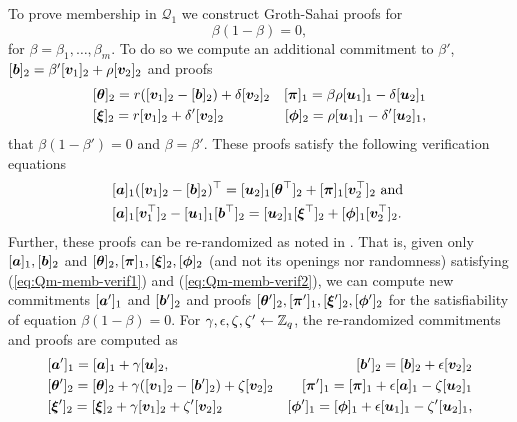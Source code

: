 
To prove membership in $\mathcal{Q}_1$ we construct Groth-Sahai proofs for
\begin{equation}
\beta(1-\beta)=0 \label{eq:Qm-memb},
\end{equation}
for $\beta=\beta_1,\ldots,\beta_m$.
To do so we compute an additional commitment to $\beta'$, $[{\boldsymbol{b}}]_2 = \beta'[{\boldsymbol{v}}_1]_2+\rho[{\boldsymbol{v}}_2]_2$ and proofs
\begin{align}
&[{\boldsymbol{\theta}}]_2 = r([{\boldsymbol{v}}_1]_2-[{\boldsymbol{b}}]_2)+\delta[{\boldsymbol{v}}_2]_2
&[{\boldsymbol{\pi}}]_1 = \beta\rho[{\boldsymbol{u}}_1]_1-\delta[{\boldsymbol{u}}_2]_1 \nonumber\\
&[{\boldsymbol{\xi}}]_2 = r[{\boldsymbol{v}}_1]_2+\delta'[{\boldsymbol{v}}_2]_2
&[{\boldsymbol{\phi}}]_2 = \rho[{\boldsymbol{u}}_1]_1 -\delta'[{\boldsymbol{u}}_2]_1,
\label{eq:Qm-memb-proofs}
\end{align}
that $\beta(1-\beta')=0$ and $\beta=\beta'$.
These proofs satisfy the following verification equations
\begin{align}
&[{\boldsymbol{a}}]_1([{\boldsymbol{v}}_1]_2-[{\boldsymbol{b}}]_2)^\top = [{\boldsymbol{u}}_2]_1[{\boldsymbol{\theta}}^\top]_2+[{\boldsymbol{\pi}}]_1[{\boldsymbol{v}}^\top_2]_2\text{ and } \label{eq:Qm-memb-verif1} \\
&[{\boldsymbol{a}}]_1[{\boldsymbol{v}}_1^\top]_2-[{\boldsymbol{u}}_1]_1[{\boldsymbol{b}}^\top]_2 = [{\boldsymbol{u}}_2]_1[{\boldsymbol{\xi}}^\top]_2 + [{\boldsymbol{\phi}}]_1[{\boldsymbol{v}}^\top_2]_2. \label{eq:Qm-memb-verif2}
\end{align}
Further, these proofs can be re-randomized as noted in \cite{C:BCCKLS09}. That is, given only $[{\boldsymbol{a}}]_1,[{\boldsymbol{b}}]_2$ and $[{\boldsymbol{\theta}}]_2,[{\boldsymbol{\pi}}]_1,[{\boldsymbol{\xi}}]_2,[{\boldsymbol{\phi}}]_2$ (and not its openings nor randomness) satisfying (\ref{eq:Qm-memb-verif1}) and (\ref{eq:Qm-memb-verif2}), we can compute new commitments $[{\boldsymbol{a}}']_1$ and $[{\boldsymbol{b}}']_2$ and proofs $[{\boldsymbol{\theta}}']_2,[{\boldsymbol{\pi}}']_1,[{\boldsymbol{\xi}}']_2,[{\boldsymbol{\phi}}']_2$ for the satisfiability of equation $\beta(1-\beta)=0$. For $\gamma,\epsilon,\zeta,\zeta'\gets\mathbb{Z}_q$, the re-randomized commitments and proofs are computed as
\begin{align}
&[{\boldsymbol{a}}']_1 = [{\boldsymbol{a}}]_1 + \gamma[{\boldsymbol{u}}]_2, &[{\boldsymbol{b}}']_2 = [{\boldsymbol{b}}]_2 + \epsilon[{\boldsymbol{v}}_2]_2 \nonumber\\
&[{\boldsymbol{\theta}}']_2 = [{\boldsymbol{\theta}}]_2 + \gamma([{\boldsymbol{v}}_1]_2-[{\boldsymbol{b}}']_2)+\zeta[{\boldsymbol{v}}_2]_2
&[{\boldsymbol{\pi}}']_1 = [{\boldsymbol{\pi}}]_1 + \epsilon[{\boldsymbol{a}}]_1-\zeta[{\boldsymbol{u}}_2]_1 \nonumber\\
&[{\boldsymbol{\xi}}']_2 = [{\boldsymbol{\xi}}]_2+\gamma[{\boldsymbol{v}}_1]_2+\zeta'[{\boldsymbol{v}}_2]_2
&[{\boldsymbol{\phi}}']_1 = [{\boldsymbol{\phi}}]_1 + \epsilon[{\boldsymbol{u}}_1]_1 -\zeta'[{\boldsymbol{u}}_2]_1,
\label{eq:Qm-rerand-proofs}
\end{align}

